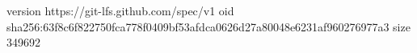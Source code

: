 version https://git-lfs.github.com/spec/v1
oid sha256:63f8c6f822750fca778f0409bf53afdca0626d27a80048e6231af960276977a3
size 349692
